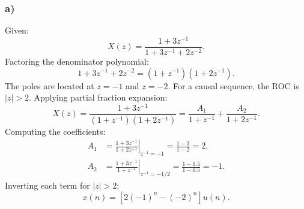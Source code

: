 \documentclass[12pt,a4paper]{article}
\begin{document}
\subsubsection*{a)}
Given:
\begin{equation}
    X(z) = \frac{1 + 3z^{-1}}{1 + 3z^{-1} + 2z^{-2}}.
\end{equation}
Factoring the denominator polynomial:
\begin{equation}
    1 + 3z^{-1} + 2z^{-2} = (1 + z^{-1})(1 + 2z^{-1}).
\end{equation}
The poles are located at $z = -1$ and $z = -2$. For a causal sequence, the ROC is $|z| > 2$.
Applying partial fraction expansion:
\begin{equation}
    X(z) = \frac{1 + 3z^{-1}}{(1 + z^{-1})(1 + 2z^{-1})} = \frac{A_1}{1 + z^{-1}} + \frac{A_2}{1 + 2z^{-1}}.
\end{equation}
Computing the coefficients:
\begin{align*}
    A_1 &= \left. \frac{1 + 3z^{-1}}{1 + 2z^{-1}} \right|_{z^{-1} = -1} = \frac{1 - 3}{1 - 2} = 2, \\
    A_2 &= \left. \frac{1 + 3z^{-1}}{1 + z^{-1}} \right|_{z^{-1} = -1/2} = \frac{1 - 1.5}{1 - 0.5} = -1.
\end{align*}
Inverting each term for $|z| > 2$:
\begin{equation}
    x(n) = \left[ 2(-1)^n - (-2)^n \right] u(n).
\end{equation}
\end{document}
